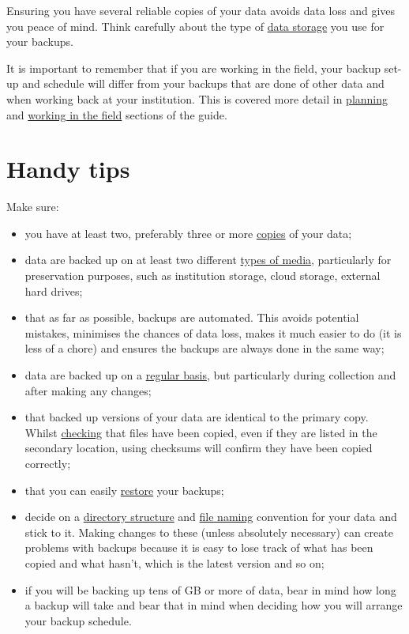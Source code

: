 \documentclass[12pt,a4paper,oneside]{report}
\providecommand{\tightlist}{%
  \setlength{\itemsep}{0pt}\setlength{\parskip}{0pt}}
\begin{document}
Ensuring you have several reliable copies of your data avoids data loss
and gives you peace of mind. Think carefully about the type of
\protect\hyperlink{storing-data}{data storage} you use for your backups.

It is important to remember that if you are working in the field, your
backup set-up and schedule will differ from your backups that are done
of other data and when working back at your institution. This is covered
more detail in \protect\hyperlink{before-you-go}{planning} and
\protect\hyperlink{in-the-field}{working in the field} sections of the
guide.

\hypertarget{handy-tips-3}{%
\section{Handy tips}\label{handy-tips-3}}

Make sure:

\begin{itemize}
\tightlist
\item
  you have at least two, preferably three or more
  \protect\hyperlink{how-much-and-how-often}{copies} of your data;
\item
  data are backed up on at least two different
  \protect\hyperlink{storing-data}{types of media}, particularly for
  preservation purposes, such as institution storage, cloud storage,
  external hard drives;
\item
  that as far as possible, backups are automated. This avoids potential
  mistakes, minimises the chances of data loss, makes it much easier to
  do (it is less of a chore) and ensures the backups are always done in
  the same way;
\item
  data are backed up on a
  \protect\hyperlink{how-much-and-how-often}{regular basis}, but
  particularly during collection and after making any changes;
\item
  that backed up versions of your data are identical to the primary
  copy. Whilst
  \protect\hyperlink{checking-and-restoring-backups}{checking} that
  files have been copied, even if they are listed in the secondary
  location, using checksums will confirm they have been copied
  correctly;
\item
  that you can easily
  \protect\hyperlink{checking-and-restoring-backups}{restore} your
  backups;
\item
  decide on a \protect\hyperlink{storing-data}{directory structure} and
  \protect\hyperlink{file-naming}{file naming} convention for your data
  and stick to it. Making changes to these (unless absolutely necessary)
  can create problems with backups because it is easy to lose track of
  what has been copied and what hasn't, which is the latest version and
  so on;
\item
  if you will be backing up tens of GB or more of data, bear in mind how
  long a backup will take and bear that in mind when deciding how you
  will arrange your backup schedule.
\end{itemize}
\end{document}

